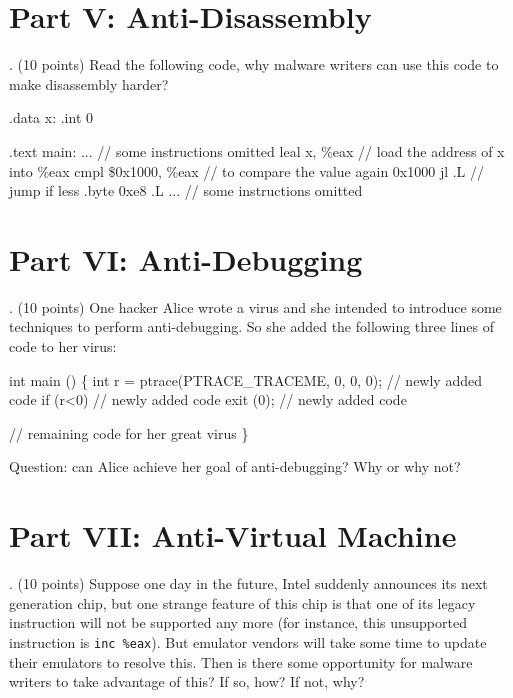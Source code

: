 \documentclass[a4paper, 10pt]{article}
\begin{document}
\newpage


\section*{Part V: Anti-Disassembly}
. (10 points) Read the following code, why malware writers
can use this code to make disassembly harder?
\begin{code}
    .data
x:
    .int 0

    .text
main:
    ...  // some instructions omitted
    leal    x, \%eax          // load the address of x into \%eax
    cmpl    \$0x1000, \%eax   // to compare the value again 0x1000
    jl      .L                // jump if less
    .byte 0xe8
.L
    ...  // some instructions omitted
\end{code}

\newpage







\section*{Part VI: Anti-Debugging}
. (10 points) One hacker Alice wrote a virus and
she intended to introduce some techniques to perform
anti-debugging. So she added the following three lines of code
to her virus:
\begin{code}
int main ()
\{
    int r = ptrace(PTRACE\_TRACEME, 0, 0, 0);   // newly added code
    if (r<0)                                   // newly added code
      exit (0);                                // newly added code
$ $\

    // remaining code for her great virus
\}
\end{code}
Question: can Alice achieve her goal of anti-debugging? Why or why not?

\newpage





\section*{Part VII: Anti-Virtual Machine}
. (10 points) Suppose one day in the future, Intel suddenly announces
its next generation chip, but one strange feature of this chip is that one of
its legacy instruction will not be supported any more (for instance, this
unsupported instruction is {\tt inc \%eax}). But emulator vendors will
take some time to update their emulators to resolve this. Then is there
some opportunity for malware writers to take advantage of this? If so, how?
If not, why?
\end{document}
